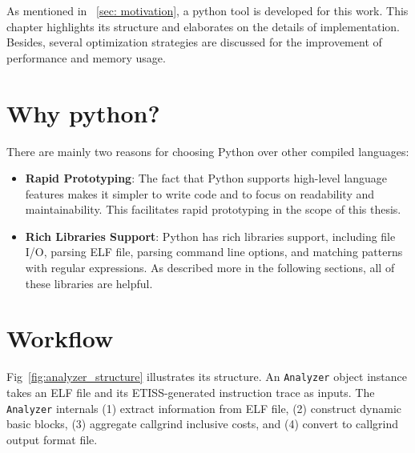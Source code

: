 As mentioned in ~\ref{sec: motivation}, a python tool is developed for this work. This chapter highlights its structure and elaborates on the details of implementation. Besides, several optimization strategies are discussed for the improvement of performance and memory usage.

\section{Why python?}

There are mainly two reasons for choosing Python over other compiled languages:

\begin{itemize}
    \item \textbf{Rapid Prototyping}: The fact that Python supports high-level language features makes it simpler to write code and to focus on readability and maintainability. This facilitates rapid prototyping in the scope of this thesis.
    \item \textbf{Rich Libraries Support}: Python has rich libraries support, including file I/O, parsing ELF file, parsing command line options, and matching patterns with regular expressions. As described more in the following sections, all of these libraries are helpful.
\end{itemize}


\section{Workflow}



Fig~\ref{fig:analyzer_structure} illustrates its structure. An \texttt{Analyzer} object instance takes an ELF file and its ETISS-generated instruction trace as inputs. The \texttt{Analyzer} internals (1) extract information from ELF file, (2) construct dynamic basic blocks, (3) aggregate callgrind inclusive costs, and (4) convert to callgrind output format file. 

